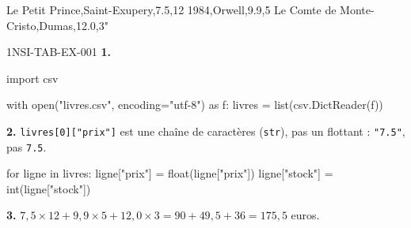 Le Petit Prince,Saint-Exupery,7.5,12
1984,Orwell,9.9,5
Le Comte de Monte-Cristo,Dumas,12.0,3"
\begin{corrige}{1NSI-TAB-EX-001}
\textbf{1.}
\begin{python}
import csv

with open("livres.csv", encoding="utf-8") as f:
    livres = list(csv.DictReader(f))
\end{python}

\textbf{2.} \lstinline{livres[0]["prix"]} est une chaîne de caractères
(\lstinline{str}), pas un flottant : \lstinline{"7.5"}, pas \lstinline{7.5}.
\begin{python}
for ligne in livres:
    ligne["prix"] = float(ligne["prix"])
    ligne["stock"] = int(ligne["stock"])
\end{python}

\textbf{3.} $7{,}5\times12+9{,}9\times5+12{,}0\times3=90+49{,}5+36=175{,}5$ euros.
\end{corrige}
